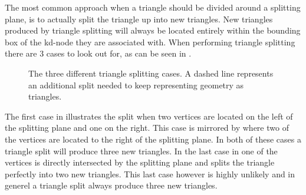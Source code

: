 
The most common approach when a triangle should be divided around a
splitting plane, is to actually split the triangle up into new
triangles. New triangles produced by triangle splitting will always be
located entirely within the bounding box of the kd-node they are
associated with. When performing triangle splitting there are 3 cases
to look out for, as can be seen in .

\begin{figure}
  \centering
  \hspace{5mm}
  \hspace{5mm}

  \vspace{3mm}
  \parbox{10cm}{\caption[The three different triangle splitting
      cases.]{The three different triangle splitting cases. A dashed
      line represents an additional split needed to keep representing
      geometry as triangles.}\label{fig:splittingCases}}
\end{figure}

The first case in  illustrates the split
when two vertices are located on the left of the splitting plane and
one on the right. This case is mirrored by 
where two of the vertices are located to the right of the splitting
plane. In both of these cases a triangle split will produce three new
triangles. In the last case in  one of the
vertices is directly intersected by the splitting plane and splits the
triangle perfectly into two new triangles. This last case however is
highly unlikely and in generel a triangle split always produce three
new triangles.


